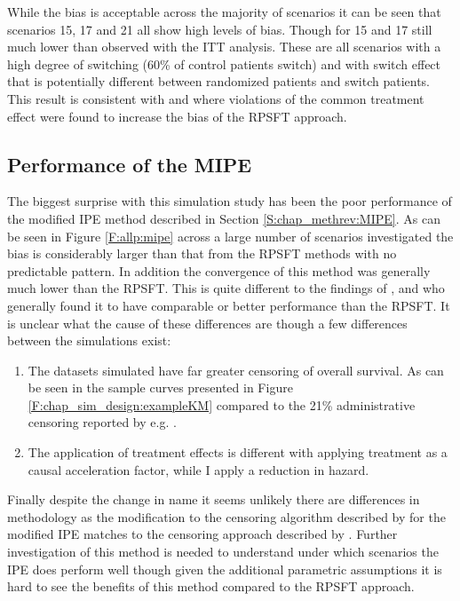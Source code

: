 While the bias is acceptable across the majority of scenarios it can be seen that scenarios 15, 17 and 21 all show high levels of bias. Though for 15 and 17 still much lower than observed with the ITT analysis. These are all scenarios with a high degree of switching (60\% of control patients switch) and with switch effect that is potentially different between randomized patients and switch patients. This result is consistent with \cite{Latimer2013} and \cite{Latimer2016} where violations of the common treatment effect were found to increase the bias of the RPSFT approach. 

\subsection{Performance of the MIPE}

The biggest surprise with this simulation study has been the poor performance of the modified IPE method described in Section \ref{S:chap_methrev:MIPE}. As can be seen in Figure \ref{F:allp:mipe} across a large number of scenarios investigated the bias is considerably larger than that from the RPSFT methods with no predictable pattern. In addition the convergence of this method was generally much lower than the RPSFT. This is quite different to the findings of \cite{Morden2011}, \cite{Latimer2013} and \cite{Latimer2016} who generally found it to have comparable or better performance than the RPSFT. It is unclear what the cause of these differences are though a few differences between the simulations exist:
\begin{enumerate}
\item The datasets simulated have far greater censoring of overall survival. As can be seen in the sample curves presented in Figure \ref{F:chap_sim_design:exampleKM} compared to the 21\% administrative censoring reported by e.g. \cite{Latimer2013}. 
\item The application of treatment effects is different with \cite{Morden2011} applying treatment as a causal acceleration factor, while I apply a reduction in hazard.
\end{enumerate}
Finally despite the change in name it seems unlikely there are differences in methodology as the modification to the censoring algorithm described by \cite{Zhang2016} for the modified IPE matches to the censoring approach described by \cite{Latimer2016}. 
Further investigation of this method is needed to understand under which scenarios the IPE does perform well though given the additional parametric assumptions it is hard to see the benefits of this method compared to the RPSFT approach. 

